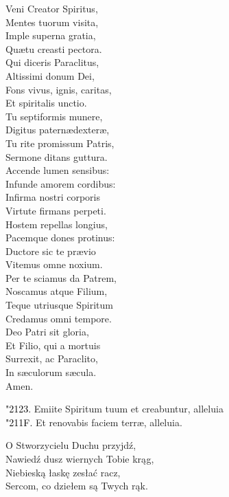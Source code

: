 \documentclass[10pt,a5paper]{book}
\newcommand{\kol}{black}
\newcommand{\textjuni}[1]{{\fontspec{Junicode-Regular}#1}}
\newcommand{\vv}{\textcolor{\kol}{\textjuni{\char"2123. }}}
\newcommand{\rr}{\textcolor{\kol}{\textjuni{\char"211F. }}}
\newcommand{\oremuss}[2]{
	\begin{sloppypar}
		\begin{paracol}{2}
			\setlength{\columnsep}{0em}
			\begin{leftcolumn}
				#1
			\end{leftcolumn}
			\begin{rightcolumn}
				#2
			\end{rightcolumn}
		\end{paracol}
	\end{sloppypar}}
\begin{document}
					\oremuss{
						Veni Creator Spiritus,\\
						Mentes tuorum visita,\\
						Imple superna gratia,\\
						Qu\ae  tu creasti pectora.\\
						
						Qui diceris Paraclitus,\\
						Altissimi donum Dei,\\
						Fons vivus, ignis, caritas,\\
						Et spiritalis unctio.\\
						
						Tu septiformis munere,\\
						Digitus patern\ae  dexter\ae ,\\
						Tu rite promissum Patris,\\
						Sermone ditans guttura.\\
						
						Accende lumen sensibus:\\
						Infunde amorem cordibus:\\
						Infirma nostri corporis\\
						Virtute firmans perpeti.\\
						
						Hostem repellas longius,\\
						Pacemque dones protinus:\\
						Ductore sic te pr\ae vio\\
						Vitemus omne noxium.\\
						
						Per te sciamus da Patrem,\\
						Noscamus atque Filium,\\
						Teque utriusque Spiritum\\
						Credamus omni tempore.\\
						
						Deo Patri sit gloria,\\
						Et Filio, qui a mortuis\\
						Surrexit, ac Paraclito,\\
						In s\ae culorum s\ae cula.\\
						Amen.
					
						\vv Emiite Spiritum tuum et creabuntur, alleluia\\
						\rr Et renovabis faciem terr\ae , alleluia.}{
						O Stworzycielu Duchu przyjdź,\\
						Nawiedź dusz wiernych Tobie krąg,\\
						Niebieską łaskę zesłać racz,\\
						Sercom, co dziełem są Twych rąk.\\
						
}
\end{document}
